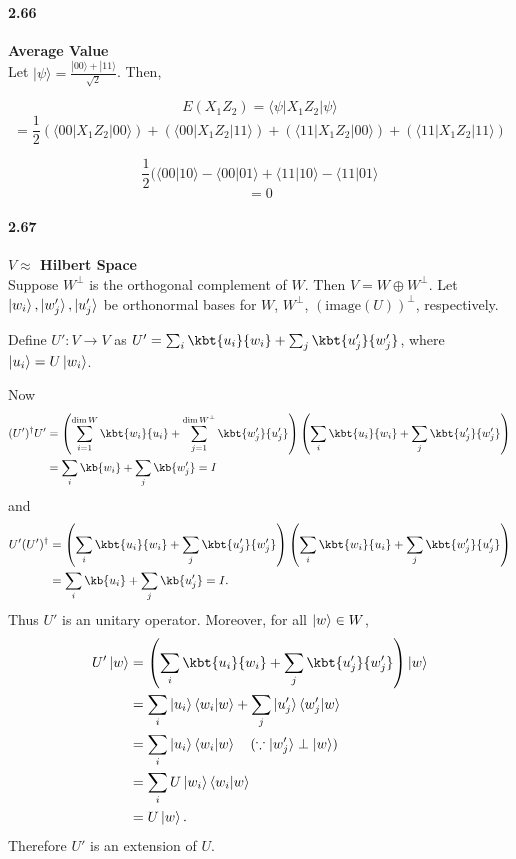 

\paragraph{2.66} \textbf{Average Value} \\%

Let $|\psi\rangle = \frac{|00\rangle + |11\rangle }{\sqrt{2}}$. Then,

$$ E(X_1 Z_2) = \langle \psi | X_1 Z_2 | \psi\rangle$$
$$ = \frac{1}{2} ( \langle 00 | X_1 Z_2 | 00\rangle) + ( \langle 00 | X_1 Z_2 | 11\rangle) + ( \langle 11 | X_1 Z_2 | 00\rangle) + ( \langle 11 | X_1 Z_2 | 11\rangle) $$

$$ \frac{1}{2}(\langle 00 | 10\rangle - \langle 00 | 01 \rangle + \langle 11 | 10\rangle - \langle 11 | 01\rangle$$
$$ = 0$$

\paragraph{2.67} \textbf{$V \approx $ Hilbert Space } \\%

Suppose $W^\perp$ is the orthogonal complement of $W$. Then $V = W \oplus W^\perp$.
Let $\ket{w_i},\ket{w_j'},\ket{u_j'}$ be orthonormal bases for $W$, $W^\perp$, $\left( \mathrm{image}(U) \right)^\perp$, respectively.

Define $U': V \rightarrow V$ as $U' = \sum_i \kbt{u_i}{w_i} + \sum_j \kbt{u_j'}{w_j'}$,
where $\ket{u_i} = U \ket{w_i}$.


Now
\begin{align*}
    (U')^\dagger U' &= \left( \sum_{i = 1}^{\dim W} \kbt{w_i}{u_i} + \sum_{j = 1}^{\dim W^\perp} \kbt{w_j'}{u_j'} \right)  \left( \sum_i \kbt{u_i}{w_i} + \sum_j \kbt{u_j'}{w_j'} \right)\\
                    &= \sum_i \kb{w_i} + \sum_j \kb{w_j'} = I
\end{align*}
%
and
%
\begin{align*}
    U' (U')^\dagger &= \left( \sum_i \kbt{u_i}{w_i} + \sum_j \kbt{u_j'}{w_j'} \right) \left( \sum_i \kbt{w_i}{u_i} + \sum_j \kbt{w_j'}{u_j'} \right)\\
                    &= \sum_i \kb{u_i} + \sum_j \kb{u_j'} = I.
\end{align*}
%
Thus $U'$ is an unitary operator.
Moreover, for all $\ket{w} \in W$,
\begin{align*}
    U' \ket{w} &= \left( \sum_i \kbt{u_i}{w_i} + \sum_j \kbt{u_j'}{w_j'} \right) \ket{w}\\
               &= \sum_i \ket{u_i} \braket{w_i | w} + \sum_j \ket{u_j'} \braket{w_j' | w}\\
			   &= \sum_i \ket{u_i} \braket{w_i | w}  ~~~(\because \ket{w_j'} \perp \ket{w})\\
			   &= \sum_i U \ket{w_i} \braket{w_i | w}\\
			   &= U \ket{w}.
\end{align*}
%
Therefore $U'$ is an extension of $U$.



